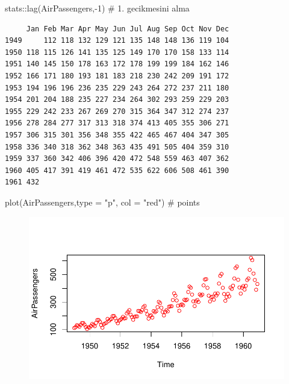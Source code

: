 \documentclass[
  letterpaper,
  DIV=11,
  numbers=noendperiod]{scrreprt}
\newenvironment{Shaded}{\begin{snugshade}}{\end{snugshade}}
\newcommand{\AttributeTok}[1]{\textcolor[rgb]{0.40,0.45,0.13}{#1}}
\newcommand{\CommentTok}[1]{\textcolor[rgb]{0.37,0.37,0.37}{#1}}
\newcommand{\DecValTok}[1]{\textcolor[rgb]{0.68,0.00,0.00}{#1}}
\newcommand{\FunctionTok}[1]{\textcolor[rgb]{0.28,0.35,0.67}{#1}}
\newcommand{\NormalTok}[1]{\textcolor[rgb]{0.00,0.23,0.31}{#1}}
\newcommand{\SpecialCharTok}[1]{\textcolor[rgb]{0.37,0.37,0.37}{#1}}
\newcommand{\StringTok}[1]{\textcolor[rgb]{0.13,0.47,0.30}{#1}}
\begin{document}
\begin{Shaded}
\begin{Highlighting}[]
\NormalTok{stats}\SpecialCharTok{::}\FunctionTok{lag}\NormalTok{(AirPassengers,}\SpecialCharTok{{-}}\DecValTok{1}\NormalTok{) }\CommentTok{\# 1. gecikmesini alma}
\end{Highlighting}
\end{Shaded}

\begin{verbatim}
     Jan Feb Mar Apr May Jun Jul Aug Sep Oct Nov Dec
1949     112 118 132 129 121 135 148 148 136 119 104
1950 118 115 126 141 135 125 149 170 170 158 133 114
1951 140 145 150 178 163 172 178 199 199 184 162 146
1952 166 171 180 193 181 183 218 230 242 209 191 172
1953 194 196 196 236 235 229 243 264 272 237 211 180
1954 201 204 188 235 227 234 264 302 293 259 229 203
1955 229 242 233 267 269 270 315 364 347 312 274 237
1956 278 284 277 317 313 318 374 413 405 355 306 271
1957 306 315 301 356 348 355 422 465 467 404 347 305
1958 336 340 318 362 348 363 435 491 505 404 359 310
1959 337 360 342 406 396 420 472 548 559 463 407 362
1960 405 417 391 419 461 472 535 622 606 508 461 390
1961 432                                            
\end{verbatim}

\begin{Shaded}
\begin{Highlighting}[]
\FunctionTok{plot}\NormalTok{(AirPassengers,}\AttributeTok{type =} \StringTok{"p"}\NormalTok{, }\AttributeTok{col =} \StringTok{"red"}\NormalTok{) }\CommentTok{\# points}
\end{Highlighting}
\end{Shaded}

\begin{figure}[H]

{\centering \includegraphics{data_analysis_files/figure-pdf/unnamed-chunk-5-1.pdf}

}

\end{figure}
\end{document}
